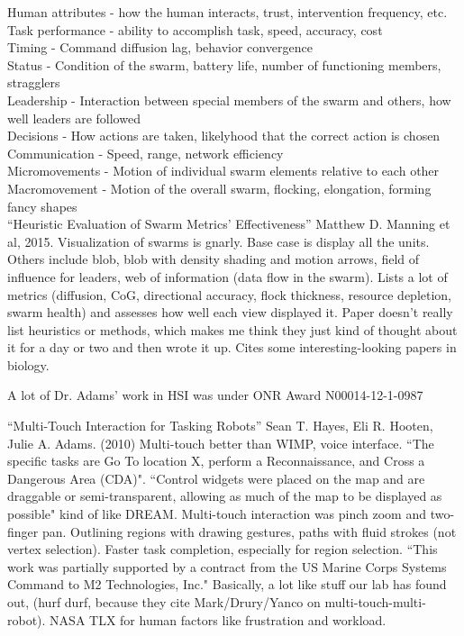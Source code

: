 \documentclass[]{article}
\begin{document}
Human attributes - how the human interacts, trust, intervention frequency, etc. \\
Task performance - ability to accomplish task, speed, accuracy, cost \\
Timing - Command diffusion lag, behavior convergence \\
Status - Condition of the swarm, battery life, number of functioning members, stragglers \\
Leadership - Interaction between special members of the swarm and others, how well leaders are followed \\
Decisions - How actions are taken, likelyhood that the correct action is chosen \\
Communication - Speed, range, network efficiency \\
Micromovements - Motion of individual swarm elements relative to each other \\
Macromovement - Motion of the overall swarm, flocking, elongation, forming fancy shapes \\

``Heuristic Evaluation of Swarm Metrics’ Effectiveness'' \cite{manning2015heuristic} Matthew D. Manning et al, 2015. Visualization of swarms is gnarly. Base case is display all the units. Others include blob, blob with density shading and motion arrows, field of influence for leaders, web of information (data flow in the swarm). Lists a lot of metrics (diffusion, CoG, directional accuracy, flock thickness, resource depletion, swarm health) and assesses how well each view displayed it. Paper doesn't really list heuristics or methods, which makes me think they just kind of thought about it for a day or two and then wrote it up. Cites some interesting-looking papers in biology. 

A lot of Dr. Adams' work in HSI was under ONR Award N00014-12-1-0987

``Multi-Touch Interaction for Tasking Robots'' \cite{hayes2010multi} Sean T. Hayes, Eli R. Hooten, Julie A. Adams. (2010) Multi-touch better than WIMP, voice interface. ``The specific tasks are Go To location X, perform a Reconnaissance, and Cross a Dangerous Area (CDA)". ``Control widgets were placed on the map and are draggable or semi-transparent, allowing as much of the map to be displayed as possible" kind of like DREAM. Multi-touch interaction was pinch zoom and two-finger pan. Outlining regions with drawing gestures, paths with fluid strokes (not vertex selection). Faster task completion, especially for region selection. ``This work was partially supported by a contract from the US Marine Corps Systems Command to M2 Technologies, Inc." Basically, a lot like stuff our lab has found out, (hurf durf, because they cite Mark/Drury/Yanco on multi-touch-multi-robot). NASA TLX for human factors like frustration and workload. 
\end{document}
